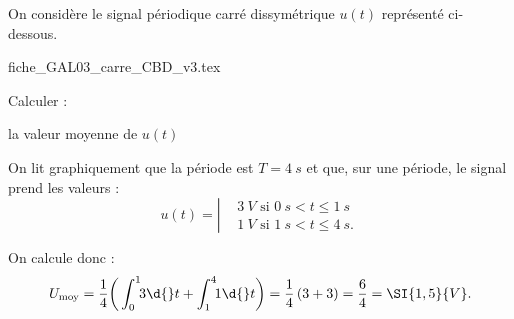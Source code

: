
\hauteurLargeurCadreReponse		{8mm}{2cm}
\initialisationEntrainement


On considère le signal périodique carré dissymétrique $u(t)$ représenté ci-dessous.
\def\ratioGraphiqueX{1.12}
\def\ratioGraphiqueY{0.8}
\begin{center}
{fiche_GAL03_carre_CBD_v3.tex}
\end{center}

\minusMedskip
Calculer : 
\minusMedskip

\debutEntrainement


\begin{enonce}
la valeur moyenne de $u(t)$
\end{enonce}


\begin{corrige}
On lit graphiquement que la période est $T=\SI{4}{s}$ et que, sur une période, le signal prend les valeurs :
\begin{equation*}
u(t) =
\left|
\begin{aligned}
&\SI{3}{V}\textrm{ si }\SI{0}{s}<t\leq \SI{1}{s}\\
&\SI{1}{V}\textrm{ si }\SI{1}{s}<t\leq \SI{4}{s}.
\end{aligned}
\right.
\end{equation*}

On calcule donc : 
\begin{equation*}
U_{\text{moy}}=\dfrac{1}{4}\bigg(\int_0^1 \!\! 3\d{}t+\int_1^4 \!\! 1\d{}t\bigg)=\dfrac{1}{4}\left(3+3\right)=\dfrac{6}{4}=\SI{1,5}{V}.
\end{equation*}
\end{corrige}

